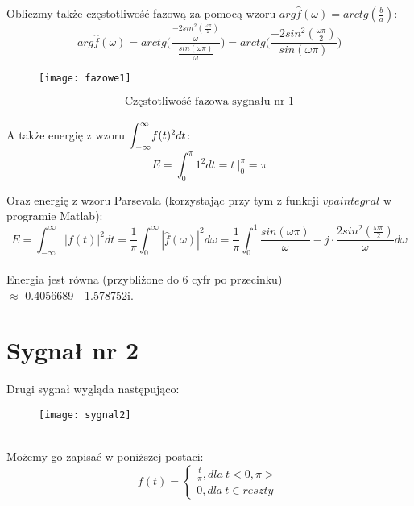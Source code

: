 \documentclass[11pt,a4paper]{article}
\numberwithin{liczba1}{liczba2}
\begin{document}
Obliczmy także częstotliwość fazową za pomocą wzoru $ arg \hat{f} (\omega) = arctg(\frac{b}{a}) $:
\begin{equation}
arg \hat{f} (\omega) = arctg \Bigg(\frac{\frac{-2sin^2(\frac{\omega \pi}{2})}{\omega}}{\frac{sin(\omega \pi)}{\omega}}\Bigg) = arctg \Bigg(\frac{-2sin^2(\frac{\omega \pi}{2})} {sin(\omega \pi)}\Bigg)
\end{equation}
\pagebreak

\begin{figure}[h]
\centering
\texttt{[image: fazowe1]}
\end{figure}
\[
\text{Częstotliwość fazowa sygnału nr 1}
\] \\

A także energię z wzoru $ \mathlarger{\int_{-\infty}^{\infty}} f(t)^2 dt $:
\begin{equation}
E = \int_{0}^{\pi} 1^2 dt = t \ \Bigg|^\pi_0 = \pi
\end{equation}

Oraz energię z wzoru Parsevala (korzystając przy tym z funkcji $ vpaintegral $ w programie Matlab): \\
\begin{equation}
E = \int_{-\infty}^{\infty} |f(t)|^2 dt = \frac{1}{\pi} \int_{0}^{\infty} |\hat{f}(\omega)|^2 d\omega = \frac{1}{\pi} \int_{0}^{1} \frac{sin(\omega \pi)}{\omega} - j \cdot \frac{2sin^2(\frac{\omega \pi}{2})}{\omega} d\omega
\end{equation} \\

Energia jest równa (przybliżone do 6 cyfr po przecinku) \\ $ \approx $ 0.4056689 - 1.578752i.
\pagebreak

\section{Sygnał nr 2}
Drugi sygnał wygląda następująco:
\begin{figure}[h]
\centering
\texttt{[image: sygnal2]}
\end{figure} \\

Możemy go zapisać w poniższej postaci:
\[
    f(t) =\left\{
                \begin{array}{ll}
                  \frac{t}{\pi}, dla\ t <0,\pi> \\
                  0, dla\ t \in reszty
                \end{array}
\label{sygnal2klamra}
\tag{2.1}
              \right.
\]
\end{document}
